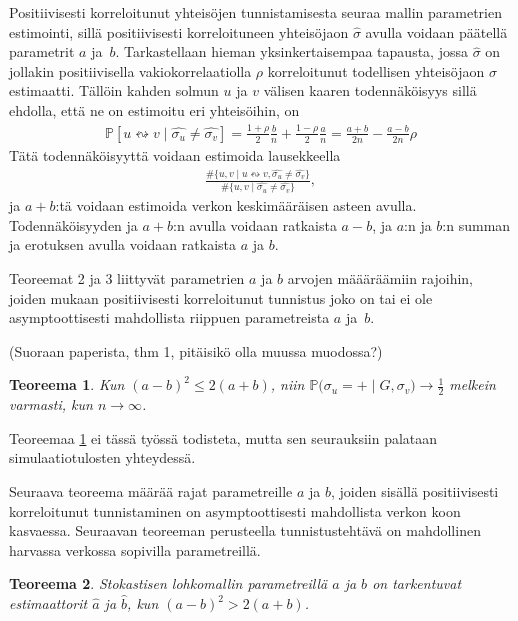 \documentclass[finnish,12pt,a4paper,pdftex,sci,utf8]{aaltothesis}
\newtheorem{teoreema}{Teoreema}
\begin{document}
Positiivisesti korreloitunut yhteisöjen tunnistamisesta seuraa mallin parametrien estimointi, sillä positiivisesti korreloituneen yhteisöjaon $\hat{\sigma}$ avulla voidaan päätellä parametrit $a$ ja $b$. Tarkastellaan hieman yksinkertaisempaa tapausta, jossa $\hat{\sigma}$ on jollakin positiivisella vakiokorrelaatiolla $\rho$ korreloitunut todellisen yhteisöjaon $\sigma$ estimaatti. Tällöin kahden solmun $u$ ja $v$ välisen kaaren todennäköisyys sillä ehdolla, että ne on estimoitu eri yhteisöihin, on
\begin{align*}
	\mathbb{P}[u \leftrightsquigarrow v \mid \hat{\sigma_{u}} \neq \hat{\sigma_{v}}] = \frac{1+\rho}{2} \frac{b}{n} + \frac{1-\rho}{2} \frac{a}{n} = \frac{a+b}{2n} - \frac{a-b}{2n} \rho
\end{align*}
Tätä todennäköisyyttä voidaan estimoida lausekkeella
\begin{align*}
	\frac{ \# \{ u,v \mid u \leftrightsquigarrow v, \hat{\sigma_{u}} \neq \hat{\sigma_{v}} \} }{ \# \{ u,v \mid \hat{\sigma_{u}} \neq \hat{\sigma_{v}}\} },
\end{align*}
ja $a+b$:tä voidaan estimoida verkon keskimääräisen asteen avulla. Todennäköisyyden ja $a+b$:n avulla voidaan ratkaista $a-b$, ja $a$:n ja $b$:n summan ja erotuksen avulla voidaan ratkaista $a$ ja $b$.

Teoreemat 2 ja 3 liittyvät parametrien $a$ ja $b$ arvojen määäräämiin rajoihin, joiden mukaan positiivisesti korreloitunut tunnistus joko on tai ei ole asymptoottisesti mahdollista riippuen parametreista $a$ ja $b$.

(Suoraan paperista, thm 1, pitäisikö olla muussa muodossa?)
\begin{teoreema}
	\label{teoreema:mahdottomuus}
	Kun $(a-b)^2 \leq 2(a+b)$, niin $\mathbb{P}\big( \sigma_u = + \mid G, \sigma_v \big) \rightarrow \frac{1}{2}$ melkein varmasti, kun $n \rightarrow \infty$. 
\end{teoreema}

Teoreemaa \ref{teoreema:mahdottomuus} ei tässä työssä todisteta, mutta sen seurauksiin palataan simulaatiotulosten yhteydessä.

Seuraava teoreema määrää rajat parametreille $a$ ja $b$, joiden sisällä positiivisesti korreloitunut tunnistaminen on asymptoottisesti mahdollista verkon koon kasvaessa.
Seuraavan teoreeman perusteella tunnistustehtävä on mahdollinen harvassa verkossa sopivilla parametreillä.
\begin{teoreema}
	\label{teoreema:tarkentuvatest}
	Stokastisen lohkomallin parametreillä $a$ ja $b$ on tarkentuvat estimaattorit $\hat{a}$ ja $\hat{b}$, kun $(a-b)^{2} > 2(a+b)$.
\end{teoreema}
\end{document}
